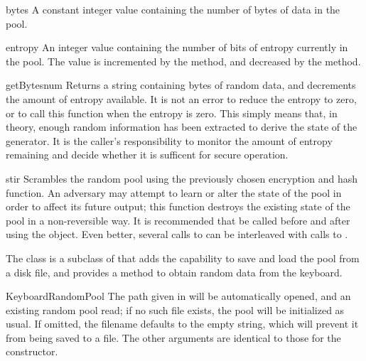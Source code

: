 \documentclass{howto}
\begin{document}
\begin{datadesc}{bytes}
A constant integer value containing the number of bytes of data in
the pool.
\end{datadesc}

\begin{datadesc}{entropy}
An integer value containing the number of bits of entropy currently in
the pool.  The value is incremented by the  method,
and decreased by the  method.
\end{datadesc}

\begin{funcdesc}{getBytes}{num}
Returns a string containing  bytes of random data, and
decrements the amount of entropy available.  It is not an error to
reduce the entropy to zero, or to call this function when the entropy
is zero.  This simply means that, in theory, enough random information has been
extracted to derive the state of the generator.  It is the caller's
responsibility to monitor the amount of entropy remaining and decide
whether it is sufficent for secure operation.
\end{funcdesc}

\begin{funcdesc}{stir}{}
Scrambles the random pool using the previously chosen encryption and
hash function.  An adversary may attempt to learn or alter the state
of the pool in order to affect its future output; this function
destroys the existing state of the pool in a non-reversible way.  It
is recommended that  be called before and after using
the  object.  Even better, several calls to
 can be interleaved with calls to .
\end{funcdesc}

The  class is a subclass of  
that adds the capability to save and load the pool from a disk file, and
provides a method to obtain random data from the keyboard.

\begin{funcdesc}{KeyboardRandomPool}{}
The path given in  will be automatically opened, and an
existing random pool read; if no such file exists, the pool will be
initialized as usual.  If omitted, the filename defaults to the empty
string, which will prevent it from being saved to a file.  The other
arguments are identical to those for the  constructor.
\end{funcdesc}
\end{document}
